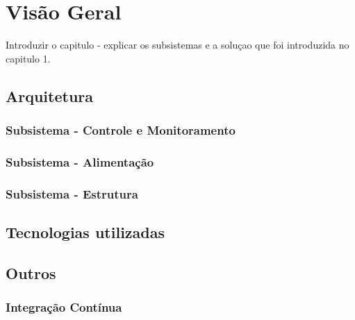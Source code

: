 \chapter{Visão Geral}

Introduzir o capitulo - explicar os subsistemas e a soluçao que foi introduzida no capitulo 1.

\section{Arquitetura}

\subsection{Subsistema - Controle e Monitoramento}

\subsection{Subsistema - Alimentação}

\subsection{Subsistema - Estrutura}

\section{Tecnologias utilizadas}

\section{Outros}

\subsection{Integração Contínua}
